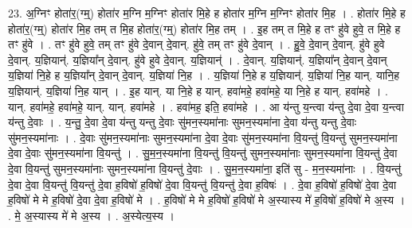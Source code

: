 \documentclass[17pt]{extarticle}
\begin{document}
23. अ॒ग्निꣳ होता॑र॒(ग्म्॒) होता॑र म॒ग्नि म॒ग्निꣳ होता॑र मि॒हे ह होता॑र म॒ग्नि म॒ग्निꣳ होता॑र मि॒ह । . होता॑र मि॒हे ह होता॑र॒(ग्म्॒) होता॑र मि॒ह तम् त मि॒ह होता॑र॒(ग्म्॒) होता॑र मि॒ह तम् । . इ॒ह तम् त मि॒हे ह तꣳ हु॑वे हुवे॒ त मि॒हे ह तꣳ हु॑वे । . तꣳ हु॑वे हुवे॒ तम् तꣳ हु॑वे दे॒वान् दे॒वान्. हु॑वे॒ तम् तꣳ हु॑वे दे॒वान् । . हु॒वे॒ दे॒वान् दे॒वान्. हु॑वे हुवे दे॒वान्. य॒ज्ञियान्॑. य॒ज्ञिया᳚न् दे॒वान्. हु॑वे हुवे दे॒वान्. य॒ज्ञियान्॑ । . दे॒वान्. य॒ज्ञियान्॑. य॒ज्ञिया᳚न् दे॒वान् दे॒वान् य॒ज्ञिया॑ नि॒हे ह य॒ज्ञिया᳚न् दे॒वान् दे॒वान्. य॒ज्ञिया॑ नि॒ह । . य॒ज्ञिया॑ नि॒हे ह य॒ज्ञियान्॑. य॒ज्ञिया॑ नि॒ह यान्. यानि॒ह य॒ज्ञियान्॑. य॒ज्ञिया॑ नि॒ह यान् । . इ॒ह यान्. या नि॒हे ह यान्. हवा॑महे॒ हवा॑महे॒ या नि॒हे ह यान्. हवा॑महे । . यान्. हवा॑महे॒ हवा॑महे॒ यान्. यान्. हवा॑महे । . हवा॑मह॒ इति॒ हवा॑महे । . आ य॑न्तु य॒न्त्वा य॑न्तु दे॒वा दे॒वा य॒न्त्वा य॑न्तु दे॒वाः । . य॒न्तु॒ दे॒वा दे॒वा य॑न्तु यन्तु दे॒वाः सु॑मन॒स्यमा॑नाः सुमन॒स्यमा॑ना दे॒वा य॑न्तु यन्तु दे॒वाः सु॑मन॒स्यमा॑नाः । . दे॒वाः सु॑मन॒स्यमा॑नाः सुमन॒स्यमा॑ना दे॒वा दे॒वाः सु॑मन॒स्यमा॑ना वि॒यन्तु॑ वि॒यन्तु॑ सुमन॒स्यमा॑ना दे॒वा दे॒वाः सु॑मन॒स्यमा॑ना वि॒यन्तु॑ । . सु॒म॒न॒स्यमा॑ना वि॒यन्तु॑ वि॒यन्तु॑ सुमन॒स्यमा॑नाः सुमन॒स्यमा॑ना वि॒यन्तु॑ दे॒वा दे॒वा वि॒यन्तु॑ सुमन॒स्यमा॑नाः सुमन॒स्यमा॑ना वि॒यन्तु॑ दे॒वाः । . सु॒म॒न॒स्यमा॑ना॒ इति॑ सु - म॒न॒स्यमा॑नाः । . वि॒यन्तु॑ दे॒वा दे॒वा वि॒यन्तु॑ वि॒यन्तु॑ दे॒वा ह॒विषो॑ ह॒विषो॑ दे॒वा वि॒यन्तु॑ वि॒यन्तु॑ दे॒वा ह॒विषः॑ । . दे॒वा ह॒विषो॑ ह॒विषो॑ दे॒वा दे॒वा ह॒विषो॑ मे मे ह॒विषो॑ दे॒वा दे॒वा ह॒विषो॑ मे । . ह॒विषो॑ मे मे ह॒विषो॑ ह॒विषो॑ मे अ॒स्यास्य मे॑ ह॒विषो॑ ह॒विषो॑ मे अ॒स्य । . मे॒ अ॒स्यास्य मे॑ मे अ॒स्य । . अ॒स्येत्य॒स्य । \newline
\end{document}
